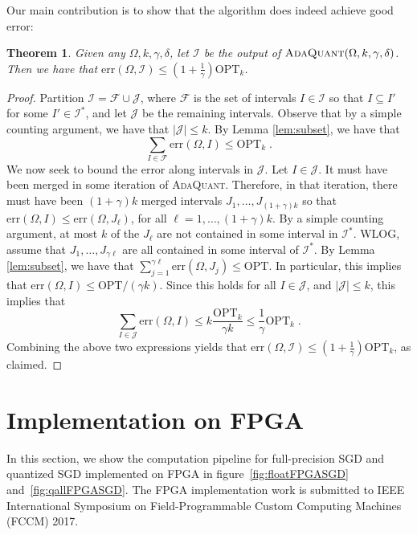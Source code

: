 \documentclass{article}
\newcommand{\err}{\ensuremath{\mathrm{err}}}
\newcommand{\setX}{\Omega}
\newcommand{\setI}{\mathcal{I}}
\newcommand{\OPT}{\ensuremath{\mathrm{OPT}}}
\newcommand{\setF}{\mathcal{F}}
\newcommand{\setJ}{\mathcal{J}}
\newtheorem{theorem}{Theorem}
\begin{document}
Our main contribution is to show that the algorithm does indeed achieve good error:
\begin{theorem}
Given any $\setX, k, \gamma, \delta$, let $\setI$ be the output of $\textsc{AdaQuant} (\setX, k, \gamma, \delta)$.
Then we have that $\err (\setX, \setI) \leq \left( 1 + \frac{1}{\gamma} \right) \OPT_k$.
\end{theorem}
\begin{proof}
Partition $\setI = \setF \cup \setJ$, where $\setF$ is the set of intervals $I \in \setI$ so that $I \subseteq I'$ for some $I' \in \setI^*$, and let $\setJ$ be the remaining intervals.
Observe that by a simple counting argument, we have that $|\setJ| \leq k$.
By Lemma \ref{lem:subset}, we have that 
\[
\sum_{I \in \setF} \err(\setX, I) \leq \OPT_k \; .
\]
We now seek to bound the error along intervals in $\setJ$.
Let $I \in \setJ$.
It must have been merged in some iteration of \textsc{AdaQuant}.
Therefore, in that iteration, there must have been $(1 + \gamma)k$ merged intervals $J_1, \ldots, J_{(1 + \gamma) k}$ so that $\err (\setX, I) \leq \err (\setX, J_\ell)$, for all $\ell = 1, \ldots, (1 + \gamma) k$.
By a simple counting argument, at most $k$ of the $J_\ell$ are not contained in some interval in $\setI^*$.
WLOG, assume that $J_1, \ldots, J_{\gamma \ell}$ are all contained in some interval of $\setI^*$.
By Lemma \ref{lem:subset}, we have that $\sum_{j = 1}^{\gamma \ell} \err (\setX, J_j) \leq \OPT$.
In particular, this implies that $\err (\setX, I) \leq \OPT / (\gamma k)$.
Since this holds for all $I \in \setJ$, and $|\setJ| \leq k$, this implies that 
\[
\sum_{I \in \setJ} \err (\setX, I) \leq k \frac{\OPT_k}{\gamma k} \leq \frac{1}{\gamma} \OPT_k \; .
\]
Combining the above two expressions yields that $\err (\setX, \setI) \leq  \left( 1 + \frac{1}{\gamma} \right) \OPT_k$, as claimed.
\end{proof}


\section{Implementation on FPGA}
\label{section:implementation}
In this section, we show the computation pipeline for full-precision SGD and quantized SGD implemented on FPGA in figure~\ref{fig:floatFPGASGD} and~\ref{fig:qallFPGASGD}. The FPGA implementation work is submitted to IEEE International Symposium on Field-Programmable Custom Computing Machines (FCCM) 2017.
\end{document}
